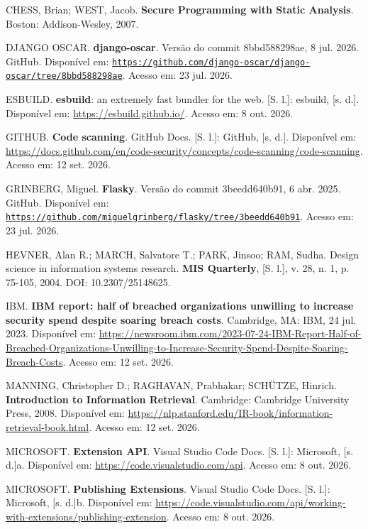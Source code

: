 \documentclass[12pt,a4paper,oneside]{report}
\newcommand{\tituloref}[1]{\textbf{#1}}
\begin{document}
CHESS, Brian; WEST, Jacob. \tituloref{Secure Programming with Static Analysis}. Boston: Addison-Wesley, 2007.

DJANGO OSCAR. \tituloref{django-oscar}. Versão do commit 8bbd588298ae, 8 jul. 2026. GitHub. Disponível em: \href{https://github.com/django-oscar/django-oscar/tree/8bbd588298ae139edc0e8114e9b567b3973fd397}{\nolinkurl{https://github.com/django-oscar/django-oscar/tree/8bbd588298ae}}. Acesso em: 23 jul. 2026.

ESBUILD. \tituloref{esbuild}: an extremely fast bundler for the web. [S. l.]: esbuild, [s. d.]. Disponível em: \url{https://esbuild.github.io/}. Acesso em: 8 out. 2026.

GITHUB. \tituloref{Code scanning}. GitHub Docs. [S. l.]: GitHub, [s. d.]. Disponível em: \url{https://docs.github.com/en/code-security/concepts/code-scanning/code-scanning}. Acesso em: 12 set. 2026.

GRINBERG, Miguel. \tituloref{Flasky}. Versão do commit 3beedd640b91, 6 abr. 2025. GitHub. Disponível em: \href{https://github.com/miguelgrinberg/flasky/tree/3beedd640b9146b0bd65c8c2ecf402b01798bc33}{\nolinkurl{https://github.com/miguelgrinberg/flasky/tree/3beedd640b91}}. Acesso em: 23 jul. 2026.

HEVNER, Alan R.; MARCH, Salvatore T.; PARK, Jinsoo; RAM, Sudha. Design science in information systems research. \tituloref{MIS Quarterly}, [S. l.], v. 28, n. 1, p. 75-105, 2004. DOI: 10.2307/25148625.

IBM. \tituloref{IBM report: half of breached organizations unwilling to increase security spend despite soaring breach costs}. Cambridge, MA: IBM, 24 jul. 2023. Disponível em: \url{https://newsroom.ibm.com/2023-07-24-IBM-Report-Half-of-Breached-Organizations-Unwilling-to-Increase-Security-Spend-Despite-Soaring-Breach-Costs}. Acesso em: 12 set. 2026.

MANNING, Christopher D.; RAGHAVAN, Prabhakar; SCHÜTZE, Hinrich. \tituloref{Introduction to Information Retrieval}. Cambridge: Cambridge University Press, 2008. Disponível em: \url{https://nlp.stanford.edu/IR-book/information-retrieval-book.html}. Acesso em: 12 set. 2026.

MICROSOFT. \tituloref{Extension API}. Visual Studio Code Docs. [S. l.]: Microsoft, [s. d.]a. Disponível em: \url{https://code.visualstudio.com/api}. Acesso em: 8 out. 2026.

MICROSOFT. \tituloref{Publishing Extensions}. Visual Studio Code Docs. [S. l.]: Microsoft, [s. d.]b. Disponível em: \url{https://code.visualstudio.com/api/working-with-extensions/publishing-extension}. Acesso em: 8 out. 2026.
\end{document}
